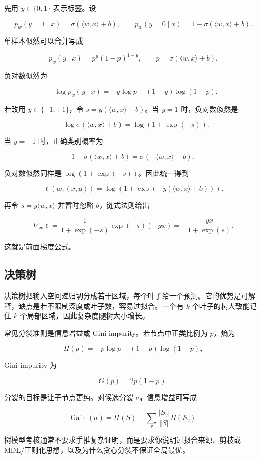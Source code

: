 先用 \(y\in\{0,1\}\) 表示标签。设

\[
  p_w(y=1\mid x)=\sigma(\langle w,x\rangle+b),
  \qquad
  p_w(y=0\mid x)=1-\sigma(\langle w,x\rangle+b).
\]

单样本似然可以合并写成

\[
  p_w(y\mid x)
  =
  p^y(1-p)^{1-y},
  \qquad
  p=\sigma(\langle w,x\rangle+b).
\]

负对数似然为

\[
  -\log p_w(y\mid x)
  =
  -y\log p-(1-y)\log(1-p).
\]

若改用 \(y\in\{-1,+1\}\)，令 \(s=y(\langle w,x\rangle+b)\)。当 \(y=1\) 时，负对数似然是

\[
  -\log\sigma(\langle w,x\rangle+b)
  =
  \log(1+\exp(-s)).
\]

当 \(y=-1\) 时，正确类别概率为

\[
  1-\sigma(\langle w,x\rangle+b)
  =
  \sigma(-\langle w,x\rangle-b),
\]

负对数似然同样是 \(\log(1+\exp(-s))\)。因此统一得到

\[
  \ell(w,(x,y))
  =
  \log(1+\exp(-y(\langle w,x\rangle+b))).
\]

再令 \(s=y\langle w,x\rangle\) 并暂时忽略 \(b\)，链式法则给出

\[
  \nabla_w \ell
  =
  \frac{1}{1+\exp(-s)}
  \exp(-s)(-y x)
  =
  -\frac{y x}{1+\exp(s)}.
\]

这就是前面梯度公式。

\subsection{决策树}

决策树把输入空间递归切分成若干区域，每个叶子给一个预测。它的优势是可解释，缺点是若不限制深度或叶子数，容易过拟合。一个有 \(k\) 个叶子的树大致能记住 \(k\) 个局部区域，因此复杂度随树大小增长。

常见分裂准则是信息增益或 Gini impurity。若节点中正类比例为 \(p\)，熵为

\[
  H(p)=-p\log p-(1-p)\log(1-p),
\]

Gini impurity 为

\[
  G(p)=2p(1-p).
\]

分裂的目标是让子节点更纯。对候选分裂 \(a\)，信息增益可写成

\[
  \operatorname{Gain}(a)
  =
  H(S)
  -
  \sum_{v}
  \frac{|S_v|}{|S|}
  H(S_v).
\]

树模型考核通常不要求手推复杂证明，而是要求你说明过拟合来源、剪枝或 MDL/正则化思想，以及为什么贪心分裂不保证全局最优。

